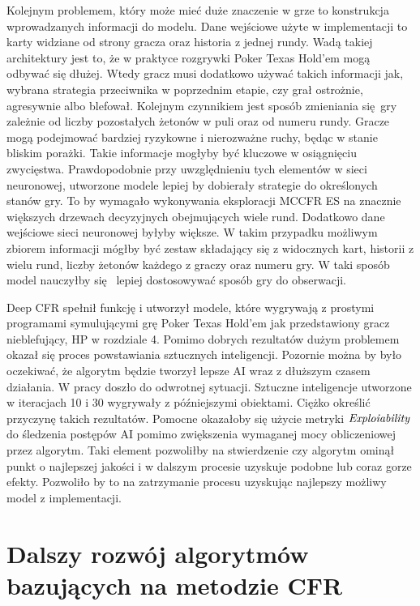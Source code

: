 \documentclass[12pt,oneside,a4paper]{report}
\begin{document}
Kolejnym problemem, który może mieć duże
znaczenie w grze to konstrukcja wprowadzanych informacji do modelu.
Dane wejściowe użyte w implementacji to karty widziane od strony gracza oraz historia 
z jednej rundy. Wadą takiej architektury jest to, że w praktyce rozgrywki Poker Texas Hold'em 
mogą odbywać się dłużej. Wtedy gracz musi dodatkowo używać takich informacji jak, wybrana strategia
przeciwnika w poprzednim etapie, czy grał ostrożnie, agresywnie albo blefował. Kolejnym czynnikiem jest 
sposób zmieniania się gry zależnie od liczby pozostałych żetonów w puli oraz od numeru rundy. Gracze
mogą podejmować bardziej ryzykowne i nierozważne ruchy, będąc w stanie bliskim porażki. Takie
informacje mogłyby być kluczowe w osiągnięciu zwycięstwa.
Prawdopodobnie przy uwzględnieniu tych elementów w sieci neuronowej, utworzone modele lepiej by
dobierały strategie do określonych stanów gry. To by wymagało wykonywania eksploracji MCCFR ES na znacznie większych drzewach decyzyjnych
obejmujących wiele rund. Dodatkowo dane wejściowe sieci neuronowej byłyby większe.
W takim przypadku
możliwym zbiorem informacji mógłby być zestaw składający się z widocznych kart, historii z wielu
rund, liczby żetonów każdego z graczy oraz numeru gry. W taki sposób model nauczyłby się 
lepiej dostosowywać sposób gry do obserwacji. 


Deep CFR spełnił funkcję i utworzył modele, które wygrywają z prostymi programami symulującymi
grę Poker Texas Hold'em jak przedstawiony gracz nieblefujący, HP w rozdziale 4. Pomimo dobrych
rezultatów dużym problemem okazał się
proces powstawiania sztucznych inteligencji. Pozornie można by było oczekiwać, że
algorytm będzie tworzył lepsze AI wraz z dłuższym czasem działania. W pracy doszło do odwrotnej
sytuacji. Sztuczne inteligencje utworzone w iteracjach 10 i 30 wygrywały z późniejszymi obiektami.
Ciężko określić przyczynę takich rezultatów. Pomocne okazałoby się użycie metryki
$\emph{Exploiability}$ do śledzenia postępów AI pomimo zwiększenia wymaganej mocy obliczeniowej
przez algorytm. Taki element pozwoliłby na stwierdzenie czy algorytm ominął punkt o najlepszej
jakości i w dalszym procesie uzyskuje podobne lub coraz gorze efekty. Pozwoliło by to na zatrzymanie procesu 
uzyskując najlepszy możliwy model z implementacji.







\section{Dalszy rozwój algorytmów bazujących na metodzie CFR}
\end{document}
